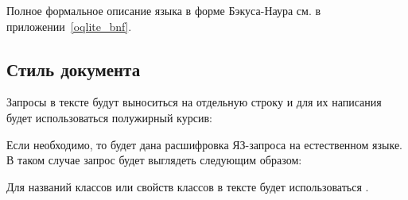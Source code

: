 
Полное формальное описание языка в форме Бэкуса-Наура см. в приложении~\ref{oqlite_bnf}.




\subsection{Стиль документа}
Запросы в тексте будут выноситься на отдельную строку и для их написания
будет использоваться полужирный курсив: 

Если необходимо, то будет дана расшифровка ЯЗ-запроса на естественном языке. В таком случае
запрос будет выглядеть следующим образом:

Для названий классов или свойств классов в тексте будет использоваться
.
